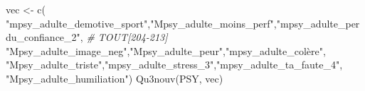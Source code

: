 \documentclass[
]{article}
\newenvironment{Shaded}{\begin{snugshade}}{\end{snugshade}}
\newcommand{\CommentTok}[1]{\textcolor[rgb]{0.56,0.35,0.01}{\textit{#1}}}
\newcommand{\FunctionTok}[1]{\textcolor[rgb]{0.00,0.00,0.00}{#1}}
\newcommand{\NormalTok}[1]{#1}
\newcommand{\OtherTok}[1]{\textcolor[rgb]{0.56,0.35,0.01}{#1}}
\newcommand{\StringTok}[1]{\textcolor[rgb]{0.31,0.60,0.02}{#1}}
\begin{document}
\begin{Shaded}
\begin{Highlighting}[]
\NormalTok{vec }\OtherTok{\textless{}{-}} \FunctionTok{c}\NormalTok{( }\StringTok{"mpsy\_adulte\_demotive\_sport"}\NormalTok{,}\StringTok{"Mpsy\_adulte\_moins\_perf"}\NormalTok{,}\StringTok{"mpsy\_adulte\_perdu\_confiance\_2"}\NormalTok{,  }\CommentTok{\# TOUT[204{-}213]}
     \StringTok{"Mpsy\_adulte\_image\_neg"}\NormalTok{,}\StringTok{"Mpsy\_adulte\_peur"}\NormalTok{,}\StringTok{"mpsy\_adulte\_colère"}\NormalTok{,}
     \StringTok{"Mpsy\_adulte\_triste"}\NormalTok{,}\StringTok{"mpsy\_adulte\_stress\_3"}\NormalTok{,}\StringTok{"mpsy\_adulte\_ta\_faute\_4"}\NormalTok{,}
     \StringTok{"Mpsy\_adulte\_humiliation"}\NormalTok{)}
\FunctionTok{Qu3nouv}\NormalTok{(PSY, vec)}
\end{Highlighting}
\end{Shaded}
\end{document}
